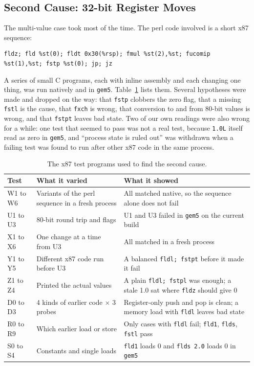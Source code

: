 \subsection{Second Cause: 32-bit Register Moves}
The multi-value case took most of the time. The perl code involved is a short x87 sequence:
\begin{lstlisting}
fldz; fld %st(0); fldt 0x30(%rsp); fmul %st(2),%st; fucomip %st(1),%st; fstp %st(0); jp; jz
\end{lstlisting}
A series of small C programs, each with inline assembly and each changing one thing, was run natively and in \texttt{gem5}. Table~\ref{tab:chr_x87tests} lists them. Several hypotheses were made and dropped on the way: that \texttt{fstp} clobbers the zero flag, that a missing \texttt{fstl} is the cause, that \texttt{fxch} is wrong, that conversion to and from 80-bit values is wrong, and that \texttt{fstpt} leaves bad state. Two of our own readings were also wrong for a while: one test that seemed to pass was not a real test, because \texttt{1.0L} itself read as zero in \texttt{gem5}, and ``process state is ruled out'' was withdrawn when a failing test was found to run after other x87 code in the same process.

\begin{table}[H]
\centering
\small
\caption{The x87 test programs used to find the second cause.}
\label{tab:chr_x87tests}
\begin{tabularx}{\textwidth}{l X X}
\toprule
\textbf{Test} & \textbf{What it varied} & \textbf{What it showed} \\
\midrule
W1 to W6 & Variants of the perl sequence in a fresh process & All matched native, so the sequence alone does not fail \\
U1 to U3 & 80-bit round trip and flags & U1 and U3 failed in \texttt{gem5} on the current build \\
X1 to X6 & One change at a time from U3 & All matched in a fresh process \\
Y1 to Y5 & Different x87 code run before U3 & A balanced \texttt{fldl; fstpt} before it made it fail \\
Z1 to Z4 & Printed the actual values & A plain \texttt{fldl; fstpl} was enough; a stale 1.0 sat where \texttt{fldz} should give 0 \\
D0 to D3 & 4 kinds of earlier code $\times$ 3 probes & Register-only push and pop is clean; a memory load with \texttt{fldl} leaves bad state \\
R0 to R9 & Which earlier load or store & Only cases with \texttt{fldl} fail; \texttt{fld1}, \texttt{flds}, \texttt{fstl} pass \\
S0 to S4 & Constants and single loads & \texttt{fld1} loads 0 and \texttt{flds 2.0} loads 0 in \texttt{gem5} \\
\bottomrule
\end{tabularx}
\end{table}

